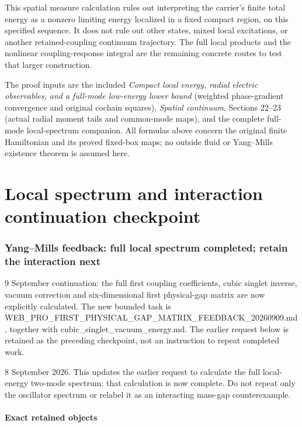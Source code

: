 \documentclass[
  11pt,
]{article}
\begin{document}
This spatial measure calculation rules out interpreting the carrier's
finite total energy as a nonzero limiting energy localized in a fixed
compact region, on this specified sequence. It does not rule out other
states, mixed local excitations, or another retained-coupling continuum
trajectory. The full local products and the nonlinear coupling-response
integral are the remaining concrete routes to test that larger
construction.

The proof inputs are the included \emph{Compact local energy, radial
electric observables, and a full-mode low-energy lower bound} (weighted
phase-gradient convergence and original cochain squares), \emph{Spatial
continuum}, Sections 22--23 (actual radial moment tails and common-mode
maps), and the complete full-mode local-spectrum companion. All formulas
above concern the original finite Hamiltonian and its proved fixed-box
maps; no outside fluid or Yang--Mills existence theorem is assumed here.

\clearpage
\part{Local spectrum and interaction continuation checkpoint}
\section{Yang--Mills feedback: full local spectrum completed; retain the
interaction
next}\label{weak-coupling-part-13-yangmills-feedback-full-local-spectrum-completed-retain-the-interaction-next}

9 September continuation: the full first coupling coefficients, cubic
singlet inverse, vacuum correction and six-dimensional first
physical-gap matrix are now explicitly calculated. The new bounded task
is WEB\_PRO\_FIRST\_PHYSICAL\_GAP\_MATRIX\_FEEDBACK\_20260909.md,
together with cubic\_singlet\_vacuum\_energy.md. The earlier request
below is retained as the preceding checkpoint, not an instruction to
repeat completed work.

8 September 2026. This updates the earlier request to calculate the full
local-energy two-mode spectrum: that calculation is now complete. Do not
repeat only the oscillator spectrum or relabel it as an interacting
mass-gap counterexample.

\subsection{Exact retained objects}\label{weak-coupling-part-13-exact-retained-objects}
\end{document}

